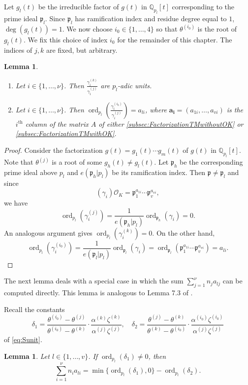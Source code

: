 \documentclass[11pt]{report}
\newtheorem{lemma}[theorem]{Lemma}
\theoremstyle{definition}
\DeclareMathOperator{\ord}{ord}
\begin{document}
Let $g_l(t)$ be the irreducible factor of $g(t)$ in $\mathbb{Q}_{p_l}[t]$ corresponding to the prime ideal $\mathfrak{p}_l$. Since $\mathfrak{p}_l$ has ramification index and residue degree equal to $1$, $\deg(g_l(t)) = 1$. We now choose $i_0 \in \{1, \dots, 4\}$ so that $\theta^{(i_0)}$ is the root of $g_l(t)$. We fix this choice of index $i_0$ for the remainder of this chapter. The indices of $j,k$ are fixed, but arbitrary.

\begin{lemma} \label{lem:SunitUnits} \
\begin{enumerate}
\item[(i)] Let $i \in \{1, \dots, \nu\}$. Then $\frac{\gamma_i^{(k)}}{\gamma_i^{(j)}}$ are $p_l$-adic units.
\item[(ii)] Let $i \in \{1, \dots, \nu\}$. Then $\ord_{p_l}\left(\frac{\gamma_i^{(i_0)}}{\gamma_i^{(j)}}\right) = a_{li}$, where $\mathbf{a_i} = (a_{1i}, \dots, a_{vi})$ is the $i^{\text{th}}$ column of the matrix $A$ of either \autoref{subsec:FactorizationTMwithoutOK} or \autoref{subsec:FactorizationTMwithOK}.
\end{enumerate}
\end{lemma}

\begin{proof}
Consider the factorization $g(t) = g_1(t) \cdots g_m(t)$ of $g(t)$ in $\mathbb{Q}_{p_l}[t]$. Note that $\theta^{(j)}$ is a root of some $g_h(t) \neq g_l(t)$. Let $\mathfrak{p}_h$ be the corresponding prime ideal above $p_l$ and $e(\mathfrak{p}_h|p_l)$ be its ramification index. Then $\mathfrak{p} \neq \mathfrak{p}_l$ and since
\[(\gamma_i)\mathcal{O}_K = \mathfrak{p}_1^{a_{1i}} \cdots \mathfrak{p}_v^{a_{vi}},\]
we have
\[\ord_{p_l}(\gamma_i^{(j)}) = \frac{1}{e(\mathfrak{p}_h|p_l)}\ord_{\mathfrak{p}_h}(\gamma_i) = 0.\]
An analogous argument gives $\ord_{p_l}(\gamma_i^{(k)}) = 0$. On the other hand,
\[\ord_{p_l}(\gamma_i^{(i_0)}) = \frac{1}{e(\mathfrak{p}_l|p_l)}\ord_{\mathfrak{p}_l}(\gamma_i) = \ord_{\mathfrak{p}_l}(\mathfrak{p}_1^{a_{1i}} \cdots \mathfrak{p}_v^{a_{vi}}) = a_{li}.\]
\end{proof}

The next lemma deals with a special case in which the sum $\sum_{j = 1}^{\nu} n_ja_{lj}$ can be computed directly. This lemma is analogous to Lemma 7.3 of \cite{TW3}.

Recall the constants
\[\delta_1 = \frac{\theta^{(i_0)} - \theta^{(j)}}{\theta^{(i_0)} - \theta^{(k)}}\cdot\frac{\alpha^{(k)}\zeta^{(k)}}{\alpha^{(j)}\zeta^{(j)}}, \quad \delta_2 = \frac{\theta^{(j)} - \theta^{(k)}}{\theta^{(k)} - \theta^{(i_0)}}\cdot \frac{\alpha^{(i_0)}\zeta^{(i_0)}}{\alpha^{(j)}\zeta^{(j)}}\]
of \eqref{eq:Sunit}.
\begin{lemma}\label{lem:Delta1}
Let $l \in \{1, \dots, v\}$. If $\ord_{p_l}(\delta_1) \neq 0$, then
\[ \sum_{i = 1}^{\nu} n_ia_{li} = \min\{\ord_{p_l}(\delta_1), 0\} - \ord_{p_l}(\delta_2).\]
\end{lemma}
\end{document}
